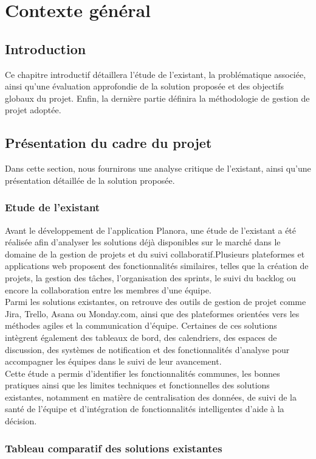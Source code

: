 \chapter{Contexte général}

\section*{Introduction}
Ce chapitre introductif détaillera l'étude de l'existant, la problématique associée, ainsi qu'une évaluation approfondie de la solution proposée et des objectifs globaux du projet. Enfin, la dernière partie définira la méthodologie de gestion de projet adoptée.

\section{Présentation du cadre du projet}
Dans cette section, nous fournirons une analyse critique de l'existant, ainsi qu'une présentation détaillée de la solution proposée.
\subsection{Etude de l'existant}
Avant le développement de l'application Planora, une étude de l'existant a été réalisée afin d'analyser les solutions déjà disponibles sur le marché dans le domaine de la gestion de projets et du suivi collaboratif.Plusieurs plateformes et applications web proposent des fonctionnalités similaires, telles que la création de projets, la gestion des tâches, l'organisation des sprints, le suivi du backlog ou encore la collaboration entre les membres d'une équipe.\\
Parmi les solutions existantes, on retrouve des outils de gestion de projet comme Jira, Trello, Asana ou Monday.com, ainsi que des plateformes orientées vers les méthodes agiles et la communication d'équipe. Certaines de ces solutions intègrent également des tableaux de bord, des calendriers, des espaces de discussion, des systèmes de notification et des fonctionnalités d'analyse pour accompagner les équipes dans le suivi de leur avancement.\\
Cette étude a permis d'identifier les fonctionnalités communes, les bonnes pratiques ainsi que les limites techniques et fonctionnelles des solutions existantes, notamment en matière de centralisation des données, de suivi de la santé de l'équipe et d'intégration de fonctionnalités intelligentes d'aide à la décision.

\subsection{Tableau comparatif des solutions existantes}


